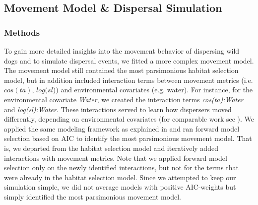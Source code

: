 \documentclass[abstract=on,10pt,a4paper,bibliography=totocnumbered]{scrartcl}
\begin{document}
\newpage
\subsection{Movement Model \& Dispersal Simulation}
\label{Appendix:DispersalSimulation}
\subsubsection{Methods}
To gain more detailed insights into the movement behavior of dispersing wild
dogs and to simulate dispersal events, we fitted a more complex movement model.
The movement model still contained the most parsimonious habitat selection
model, but in addition included interaction terms between movement metrics (i.e.
\(cos(ta)\), \(log(sl\))) and environmental covariates (e.g. water). For
instance, for the environmental covariate \textit{Water}, we created the
interaction terms \textit{cos(ta):Water} and \textit{log(sl):Water}. These
interactions served to learn how dispersers moved differently, depending on
environmental covariates (for comparable work see \cite{Prokopenko.2017}). We
applied the same modeling framework as explained in  and ran
forward model selection based on AIC to identify the most parsimonious movement
model. That is, we departed from the habitat selection model and iteratively
added interactions with movement metrics. Note that we applied forward model
selection only on the newly identified interactions, but not for the terms that
were already in the habitat selection model. Since we attempted to keep our
simulation simple, we did not average models with positive AIC-weights but
simply identified the most parsimonious movement model.
\end{document}
